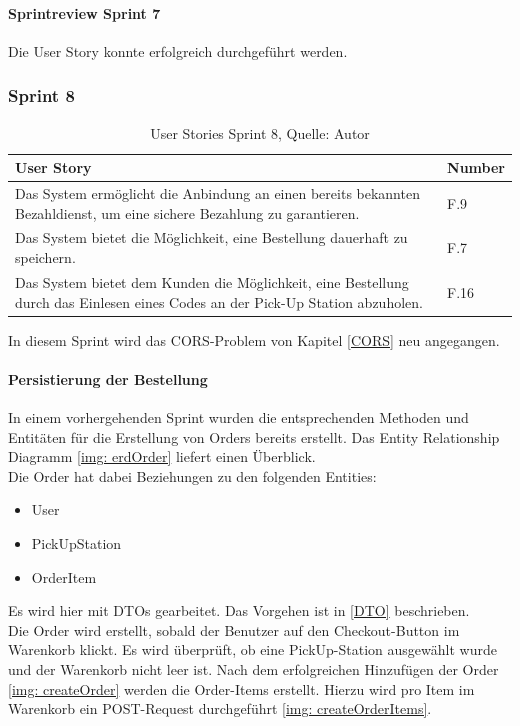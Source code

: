 \paragraph{Sprintreview Sprint 7}
Die \gls{User Story} konnte erfolgreich durchgeführt werden. 

\subsubsection{Sprint 8}\label{sprint8}
\begin{table}[H]
	\setlength\extrarowheight{2pt} %
	\begin{tabularx}{\textwidth}{|X|l|}
		\hline
		\textbf{User Story} & \textbf{Number} \\
		\hline
		Das System ermöglicht die Anbindung an einen bereits bekannten Bezahldienst, um eine sichere Bezahlung zu garantieren.  & F.9\\
		\hline
		Das System bietet die Möglichkeit, eine Bestellung dauerhaft zu speichern. & F.7\\
		\hline
		Das System bietet dem Kunden die Möglichkeit, eine Bestellung durch das Einlesen eines Codes an der Pick-Up Station abzuholen.  & F.16\\
		\hline
	\end{tabularx} 
	\caption[User Stories Sprint 8]{User Stories Sprint 8, Quelle: Autor}
\end{table}\label{userStoriesSprint8}
In diesem Sprint wird das CORS-Problem von Kapitel \ref{CORS} neu angegangen. 

\paragraph{Persistierung der Bestellung}
In einem vorhergehenden Sprint wurden die entsprechenden Methoden und Entitäten für die Erstellung von Orders bereits erstellt. Das Entity Relationship Diagramm \ref{img: erdOrder} liefert einen Überblick. \\
Die Order hat dabei Beziehungen zu den folgenden Entities: 
\begin{itemize}
	\item User
	\item PickUpStation
	\item OrderItem
\end{itemize}
Es wird hier mit \ac{DTO}s gearbeitet. Das Vorgehen ist in \ref{DTO} beschrieben. \\
Die Order wird erstellt, sobald der Benutzer auf den Checkout-Button im Warenkorb klickt. Es wird überprüft, ob eine PickUp-Station ausgewählt wurde und der Warenkorb nicht leer ist. Nach dem erfolgreichen Hinzufügen der Order \ref{img: createOrder} werden die Order-Items erstellt. Hierzu wird pro Item im Warenkorb ein POST-Request durchgeführt \ref{img: createOrderItems}. 

